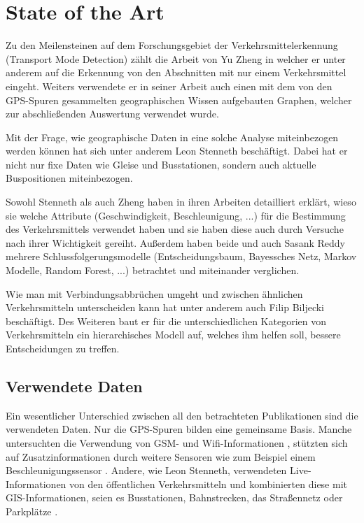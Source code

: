 \chapter{State of the Art}
Zu den Meilensteinen auf dem Forschungsgebiet der Verkehrsmittelerkennung (Transport Mode Detection) zählt die Arbeit von Yu Zheng in welcher er unter anderem auf die Erkennung von den Abschnitten mit nur einem Verkehrsmittel eingeht. Weiters verwendete er in seiner Arbeit auch einen mit dem von den GPS-Spuren gesammelten geographischen Wissen aufgebauten Graphen, welcher zur abschließenden Auswertung verwendet wurde.\cite{zheng_understanding_2010} \cite{zheng_understanding_2008} \cite{zheng_learning_2008}

Mit der Frage, wie geographische Daten in eine solche Analyse miteinbezogen werden können hat sich unter anderem Leon Stenneth beschäftigt. Dabei hat er nicht nur fixe Daten wie Gleise und Busstationen, sondern auch aktuelle Buspositionen miteinbezogen. \cite{stenneth_transportation_2011}

Sowohl Stenneth als auch Zheng haben in ihren Arbeiten detailliert erklärt, wieso sie welche Attribute (Geschwindigkeit, Beschleunigung, ...) für die Bestimmung des Verkehrsmittels verwendet haben und sie haben diese auch durch Versuche nach ihrer Wichtigkeit gereiht. Außerdem haben beide und auch Sasank Reddy \cite{reddy_determining_2008} mehrere Schlussfolgerungsmodelle (Entscheidungsbaum, Bayessches Netz, Markov Modelle, Random Forest, ...) betrachtet und miteinander verglichen. 

Wie man mit Verbindungsabbrüchen umgeht und zwischen ähnlichen Verkehrsmitteln unterscheiden kann hat unter anderem auch Filip Biljecki beschäftigt. Des Weiteren baut er für die unterschiedlichen Kategorien von Verkehrsmitteln ein hierarchisches Modell auf, welches ihm helfen soll, bessere Entscheidungen zu treffen. \cite{biljecki_transportation_2013}

\section{Verwendete Daten}
Ein wesentlicher Unterschied zwischen all den betrachteten Publikationen sind die verwendeten Daten. Nur die GPS-Spuren bilden eine gemeinsame Basis. Manche untersuchten die Verwendung von GSM- und Wifi-Informationen \cite{reddy_using_2010}, stützten sich auf Zusatzinformationen durch weitere Sensoren wie zum Beispiel einem Beschleunigungssensor \cite{reddy_using_2010}  \cite{nadine_schussler_improving_2011}. Andere, wie Leon Stenneth, verwendeten Live-Informationen von den öffentlichen Verkehrsmitteln und kombinierten diese mit GIS-Informationen, seien es Busstationen, Bahnstrecken, das Straßennetz oder Parkplätze \cite{stenneth_transportation_2011}.

